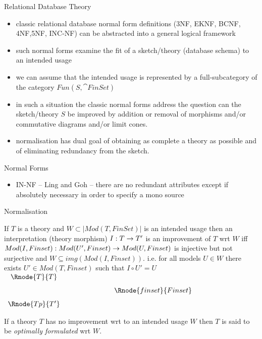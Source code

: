 \begin{frame}{Relational Database Theory}
\begin{itemize}
\item classic relational database normal form definitions ({\scriptsize 3NF, EKNF, BCNF, 4NF,5NF, INC-NF}) can be abstracted  into a general logical framework

\item such normal forms  examine the fit of a sketch/theory (database schema) to an intended usage

\item we can assume that the intended usage is represented by a full-subcategory of the category $Fun(S,\cat{FinSet})$

\item in such a situation the classic normal forms address the question can the sketch/theory $S$ be improved by addition or removal of morphisms and/or commutative diagrams and/or limit cones.
\item normalisation has dual goal of obtaining as complete a theory as possible and of eliminating redundancy from the sketch.  
\end{itemize}
\end{frame}

\begin{frame}{Normal Forms}
\begin{itemize}
\item IN-NF -- Ling and Goh -- there are no redundant attributes except if absolutely necessary in order to specify a mono source
\end{itemize}
\end{frame}

\iffalse %
\begin{frame}{Normalisation}
\begin{definition}
{ \footnotesize
If $T$ is a theory and $W \subset |Mod(T,FinSet)|$ is an intended usage then an interpretation (theory morphism) $I: T \rightarrow T'$ is an improvement of $T$ wrt $W$ iff 
$Mod(I,Finset): Mod(U',Finset) \rightarrow Mod(U,Finset)$ is injective but not surjective
and $W \subseteq img(Mod(I,Finset))$.
i.e. for all models $U \in W$ there exists $U' \in Mod(T,Finset)$ such that $I \circ U'=U$
$
\begin{array} {c p{2cm} c}
\Rnode{T}{T} && \\ [0.25cm]
             && \Rnode{finset}{Finset} \\ [0.25cm]
\Rnode{Tp}{T'}  
\end{array}
$
}
\end{definition}

\begin{definition}
If a theory $T$ has no improvement wrt to an intended usage $W$ then $T$ is said to be \textit{optimally formulated} wrt $W$.
\end{definition}
\end{frame}


